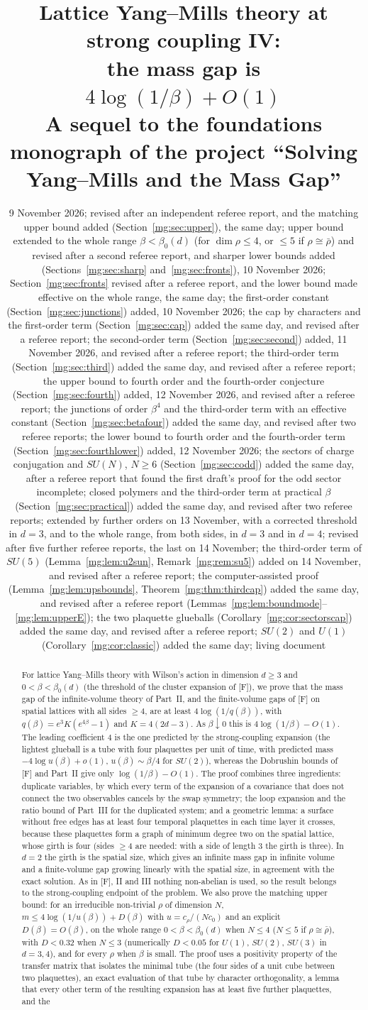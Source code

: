 \documentclass[11pt,a4paper]{article}
\title{Lattice Yang--Mills theory at strong coupling IV:\\ the mass gap is $4\log(1/\beta)+O(1)$\\
\large A sequel to the foundations monograph of the project ``Solving Yang--Mills and the Mass Gap''}
\author{}
\date{9 November 2026; revised after an independent referee report, and the matching upper bound added (Section~\ref{mg:sec:upper}), the same day;
upper bound extended to the whole range $\beta<\beta_0(d)$ (for $\dim\rho\le4$, or $\le5$ if $\rho\cong\bar\rho$) and revised after a second referee
report, and sharper lower bounds added (Sections~\ref{mg:sec:sharp} and~\ref{mg:sec:fronts}), 10 November 2026; Section~\ref{mg:sec:fronts} revised
after a referee report, and the lower bound made effective on the whole range, the same day; the first-order constant (Section~\ref{mg:sec:junctions})
added, 10 November 2026; the cap by characters and the first-order term (Section~\ref{mg:sec:cap}) added the same day, and revised after a referee
report; the second-order term (Section~\ref{mg:sec:second}) added, 11 November 2026, and revised after a referee report; the third-order term
(Section~\ref{mg:sec:third}) added the same day, and revised after a referee report; the upper bound to fourth order and the fourth-order
conjecture (Section~\ref{mg:sec:fourth}) added, 12 November 2026, and revised after a referee report; the junctions of order $\beta^4$ and the
third-order term with an effective constant (Section~\ref{mg:sec:betafour}) added the same day, and revised after two referee reports; the lower bound to
fourth order and the fourth-order term (Section~\ref{mg:sec:fourthlower}) added, 12 November 2026; the sectors of charge conjugation and $SU(N)$, $N\ge6$ (Section~\ref{mg:sec:codd}) added the same day,
after a referee report that found the first draft's proof for the odd sector incomplete; closed polymers and the third-order term at practical $\beta$
(Section~\ref{mg:sec:practical}) added the same day, and revised after two referee reports; extended by further orders on 13 November, with a
corrected threshold in $d=3$, and to the whole range, from both sides, in $d=3$ and in $d=4$; revised after five further referee reports, the last on 14 November; the third-order term of $SU(5)$
(Lemma~\ref{mg:lem:u2sun}, Remark~\ref{mg:rem:su5}) added on 14 November, and revised after a referee report; the computer-assisted proof
(Lemma~\ref{mg:lem:upsbounds}, Theorem~\ref{mg:thm:thirdcap}) added the same day, and revised after a referee report (Lemmas~\ref{mg:lem:boundmode}--\ref{mg:lem:upperE}); the two plaquette glueballs (Corollary~\ref{mg:cor:sectorscap}) added the same day, and revised after a referee report; $SU(2)$ and $U(1)$
(Corollary~\ref{mg:cor:classic}) added the same day; living document}
\theoremstyle{definition}
\theoremstyle{remark}
\begin{document}
\maketitle

\begin{abstract}
For lattice Yang--Mills theory with Wilson's action in dimension $d\ge3$ and $0<\beta<\beta_0(d)$ (the threshold of
the cluster expansion of [F]), we prove that the mass gap of the infinite-volume theory of Part~II, and the finite-volume
gaps of [F] on spatial lattices with all sides $\ge4$, are at least $4\log(1/q(\beta))$, with $q(\beta)=e^3K(e^{4\beta}-1)$ and
$K=4(2d-3)$. As $\beta\downarrow0$ this is $4\log(1/\beta)-O(1)$. The leading coefficient $4$ is the one predicted by the
strong-coupling expansion (the lightest glueball is a tube with four plaquettes per unit of time, with predicted mass
$-4\log u(\beta)+o(1)$, $u(\beta)\sim\beta/4$ for $SU(2)$), whereas the Dobrushin bounds of [F] and Part~II give only
$\log(1/\beta)-O(1)$. The
proof combines three ingredients: duplicate variables, by which every term of the expansion of a covariance that does
not connect the two observables cancels by the swap symmetry; the loop expansion and the ratio bound of Part~III for the
duplicated system; and a geometric lemma: a surface without free edges has at least four temporal plaquettes in each
time layer it crosses, because these plaquettes form a graph of minimum degree two on the spatial lattice, whose girth
is four (sides $\ge4$ are needed: with a side of length $3$ the girth is three). In $d=2$ the girth is the spatial size,
which gives an infinite mass gap in infinite volume and a finite-volume gap growing linearly with the spatial size, in
agreement with the exact solution. As in [F], II and III nothing non-abelian is used, so the result belongs to the
strong-coupling endpoint of the problem. We also prove the matching upper bound: for an irreducible non-trivial $\rho$ of dimension $N$,
$m\le4\log(1/u(\beta))+D(\beta)$ with $u=c_\rho/(Nc_0)$ and an explicit $D(\beta)=O(\beta)$, on the whole range $0<\beta<\beta_0(d)$
when $N\le4$ ($N\le5$ if $\rho\cong\bar\rho$), with $D<0.32$ when $N\le3$ (numerically $D<0.05$ for $U(1)$, $SU(2)$, $SU(3)$ in $d=3,4$),
and for every $\rho$ when $\beta$ is small. The proof uses a positivity property of the
transfer matrix that isolates the minimal tube (the four sides of a unit cube between two plaquettes), an exact evaluation of that tube by
character orthogonality, a lemma that every other term of the resulting expansion has at least five further plaquettes, and the

\end{abstract}
\end{document}
